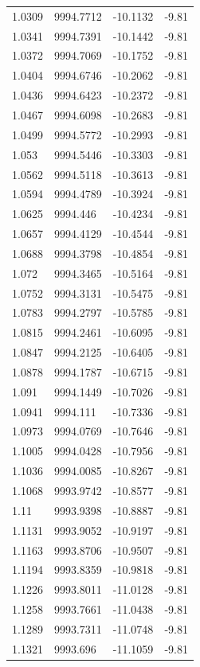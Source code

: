 \begin{table}[H]
\begin{tabular}{llll}
1.0309 & 9994.7712 & -10.1132 & -9.81 \\
1.0341 & 9994.7391 & -10.1442 & -9.81 \\
1.0372 & 9994.7069 & -10.1752 & -9.81 \\
1.0404 & 9994.6746 & -10.2062 & -9.81 \\
1.0436 & 9994.6423 & -10.2372 & -9.81 \\
1.0467 & 9994.6098 & -10.2683 & -9.81 \\
1.0499 & 9994.5772 & -10.2993 & -9.81 \\
1.053 & 9994.5446 & -10.3303 & -9.81 \\
1.0562 & 9994.5118 & -10.3613 & -9.81 \\
1.0594 & 9994.4789 & -10.3924 & -9.81 \\
1.0625 & 9994.446 & -10.4234 & -9.81 \\
1.0657 & 9994.4129 & -10.4544 & -9.81 \\
1.0688 & 9994.3798 & -10.4854 & -9.81 \\
1.072 & 9994.3465 & -10.5164 & -9.81 \\
1.0752 & 9994.3131 & -10.5475 & -9.81 \\
1.0783 & 9994.2797 & -10.5785 & -9.81 \\
1.0815 & 9994.2461 & -10.6095 & -9.81 \\
1.0847 & 9994.2125 & -10.6405 & -9.81 \\
1.0878 & 9994.1787 & -10.6715 & -9.81 \\
1.091 & 9994.1449 & -10.7026 & -9.81 \\
1.0941 & 9994.111 & -10.7336 & -9.81 \\
1.0973 & 9994.0769 & -10.7646 & -9.81 \\
1.1005 & 9994.0428 & -10.7956 & -9.81 \\
1.1036 & 9994.0085 & -10.8267 & -9.81 \\
1.1068 & 9993.9742 & -10.8577 & -9.81 \\
1.11 & 9993.9398 & -10.8887 & -9.81 \\
1.1131 & 9993.9052 & -10.9197 & -9.81 \\
1.1163 & 9993.8706 & -10.9507 & -9.81 \\
1.1194 & 9993.8359 & -10.9818 & -9.81 \\
1.1226 & 9993.8011 & -11.0128 & -9.81 \\
1.1258 & 9993.7661 & -11.0438 & -9.81 \\
1.1289 & 9993.7311 & -11.0748 & -9.81 \\
1.1321 & 9993.696 & -11.1059 & -9.81 \\

\end{tabular}
\end{table}
